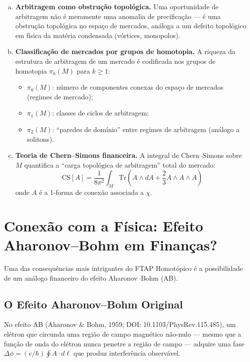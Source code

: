 \begin{enumerate}[(a)]
 \item \textbf{Arbitragem como obstru\c{c}\~ao topol\'ogica.} Uma oportunidade de arbitragem n\~ao \'e meramente uma anomalia de precifica\c{c}\~ao --- \'e uma obstru\c{c}\~ao topol\'ogica no espa\c{c}o de mercados, an\'aloga a um defeito topol\'ogico em f\'isica da mat\'eria condensada (v\'ortices, monopolos).

 \item \textbf{Classifica\c{c}\~ao de mercados por grupos de homotopia.} A riqueza da estrutura de arbitragem de um mercado \'e codificada nos grupos de homotopia $\pi_k(M)$ para $k \geq 1$:
 \begin{itemize}
 \item $\pi_0(M)$: n\'umero de componentes conexas do espa\c{c}o de mercados (regimes de mercado);
 \item $\pi_1(M)$: classes de ciclos de arbitragem;
 \item $\pi_2(M)$: ``paredes de dom\'inio'' entre regimes de arbitragem (an\'alogo a solitons).
 \end{itemize}

 \item \textbf{Teoria de Chern--Simons financeira.} A integral de Chern--Simons sobre $M$ quantifica a ``carga topol\'ogica de arbitragem'' total do mercado:
 \begin{equation}\label{eq:chern-simons}
 \text{CS}[A] = \frac{1}{8\pi^2} \int_M \text{Tr}\left( A \wedge dA + \frac{2}{3} A \wedge A \wedge A \right)
 \end{equation}
 onde $A$ \'e a 1-forma de conex\~ao associada a $\chi$.
\end{enumerate}

\section{Conex\~ao com a F\'isica: Efeito Aharonov--Bohm em Finan\c{c}as?}

Uma das consequ\^encias mais intrigantes do FTAP Homot\'opico \'e a possibilidade de um an\'alogo financeiro do efeito Aharonov--Bohm (AB).

\subsection{O Efeito Aharonov--Bohm Original}

No efeito AB (Aharonov \& Bohm, 1959; DOI: 10.1103/PhysRev.115.485), um el\'etron que circunda uma regi\~ao de campo magn\'etico n\~ao-nulo --- mesmo que a fun\c{c}\~ao de onda do el\'etron nunca penetre a regi\~ao de campo --- adquire uma fase $\Delta\phi = (e/\hbar)\oint A \cdot d\ell$ que produz interfer\^encia observ\'avel.

